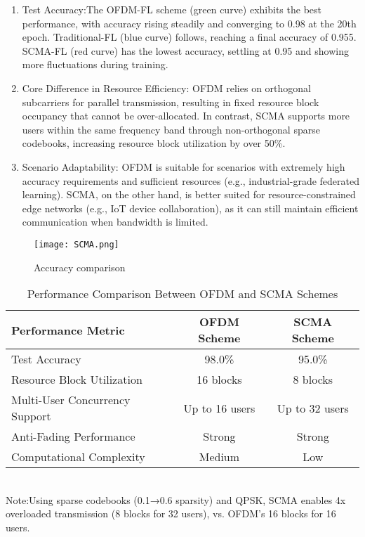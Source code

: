 \documentclass[runningheads]{llncs}
\begin{document}
\begin{enumerate}
\item Test Accuracy:The OFDM-FL\cite{guo2021over} scheme (green curve) exhibits the best performance, with accuracy rising steadily and converging to 0.98 at the 20th epoch. Traditional-FL (blue curve) follows, reaching a final accuracy of 0.955. SCMA-FL (red curve) has the lowest accuracy, settling at 0.95 and showing more fluctuations during training.
\item Core Difference in Resource Efficiency:
OFDM relies on orthogonal subcarriers for parallel transmission, resulting in fixed resource block occupancy that cannot be over-allocated. In contrast, SCMA supports more users within the same frequency band through non-orthogonal sparse codebooks, increasing resource block utilization by over 50\%.
\item Scenario Adaptability:
OFDM is suitable for scenarios with extremely high accuracy requirements and sufficient resources (e.g., industrial-grade federated learning). SCMA, on the other hand, is better suited for resource-constrained edge networks (e.g., IoT device collaboration), as it can still maintain efficient communication when bandwidth is limited.
\end{enumerate}
\begin{figure}[!t]
\centering
\texttt{[image: SCMA.png]} %
\caption{Accuracy comparison} 
\label{fig1}
\end{figure}
\begin{table}[!t]
\centering
\caption{Performance Comparison Between OFDM and SCMA Schemes}
\label{tab:ofdm_scma_comparison}
\renewcommand{\arraystretch}{1.3}  %
\small  %
\begin{tabular}{|l|c|c|}  
\hline  %
\textbf{Performance Metric}          & \textbf{OFDM Scheme}       & \textbf{SCMA Scheme}       \\ 
\hline  %
Test Accuracy                        & 98.0\%                     & 95.0\%                      \\ 
\hline  %
Resource Block Utilization           & 16 blocks                  & 8 blocks                    \\ 
\hline
Multi-User Concurrency Support       & Up to 16 users             & Up to 32 users              \\ 
\hline
Anti-Fading Performance              & Strong                     & Strong                      \\ 
\hline
Computational Complexity             & Medium                     & Low                         \\ 
\hline  %
\end{tabular}\\
\footnotesize{Note:Using sparse codebooks (0.1→0.6 sparsity) and QPSK, SCMA enables 4x overloaded transmission (8 blocks for 32 users), vs. OFDM’s 16 blocks for 16 users.}
\end{table}
\end{document}

